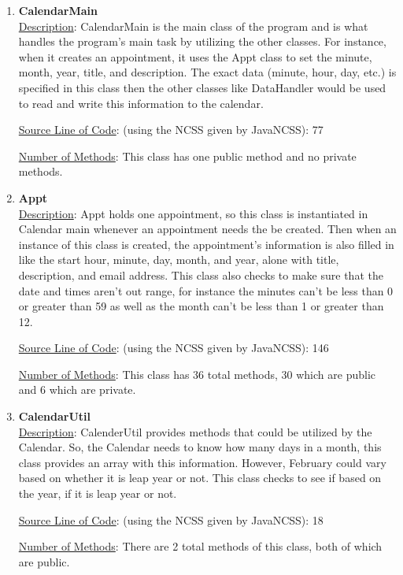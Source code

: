 \documentclass[12pt]{article}
\begin{document}
\begin{enumerate}
\item \textbf {CalendarMain} \\
\underline{Description}: CalendarMain is the main class of the program and is what handles the program's main task by utilizing the other classes. For instance, when it creates an appointment, it uses the Appt class to set the minute, month, year, title, and description. The exact data (minute, hour, day, etc.) is specified in this class then the other classes like DataHandler would be used to read and write this information to the calendar. 

\underline{Source Line of Code}: (using the NCSS given by JavaNCSS): 77 

\underline{Number of Methods}: This class has one public method and no private methods.

\item \textbf {Appt} \\
\underline{Description}: Appt holds one appointment, so this class is instantiated in Calendar main whenever an appointment needs the be created. Then when an instance of this class is created, the appointment's information is also filled in like the start hour, minute, day, month, and year, alone with title, description, and email address. This class also checks to make sure that the date and times aren't out range, for instance the minutes can't be less than 0 or greater than 59 as well as the month can't be less than 1 or greater than 12. 

\underline{Source Line of Code}: (using the NCSS given by JavaNCSS): 146 

\underline{Number of Methods}: This class has 36 total methods, 30 which are public and 6 which are private. 

\item \textbf {CalendarUtil} \\
\underline{Description}: CalenderUtil provides methods that could be utilized by the Calendar. So, the Calendar needs to know how many days in a month, this class provides an array with this information. However, February could vary based on whether it is leap year or not. This class checks to see if based on the year, if it is leap year or not. 

\underline{Source Line of Code}: (using the NCSS given by JavaNCSS): 18 

\underline{Number of Methods}: There are 2 total methods of this class, both of which are public. 


\end{enumerate}
\end{document}
